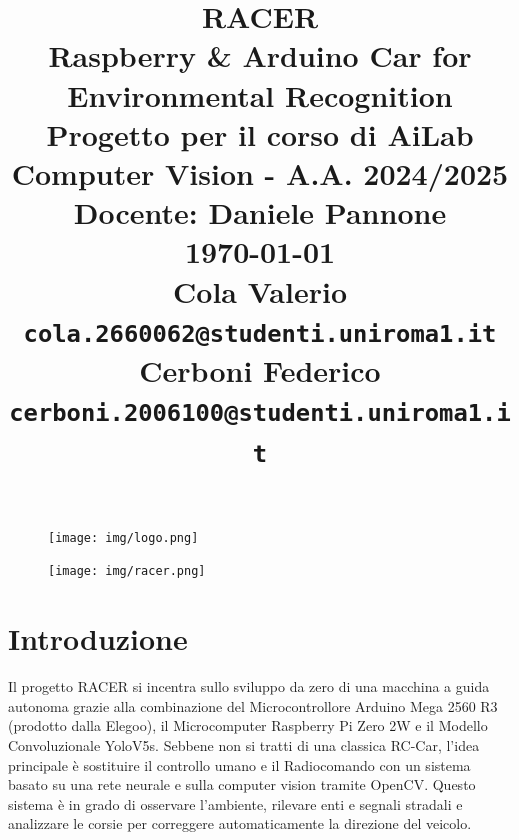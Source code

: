 \documentclass{article}
\begin{document}
\begin{figure}
    \texttt{[image: img/logo.png]}
\end{figure}

\title{
  \textbf{RACER} \\
  \Large\textbf{Raspberry \& Arduino Car for Environmental Recognition} \\
  \vspace{1cm}
  \large{Progetto per il corso di AiLab Computer Vision - A.A. 2024/2025} \\
  \vspace{0.5cm}
  \large{Docente: Daniele Pannone} \\
  \vspace{0.5cm}
  \large \today\\[24pt]
    
  \large{Cola Valerio \texttt{cola.2660062@studenti.uniroma1.it}}\\
  \large{Cerboni Federico \texttt{cerboni.2006100@studenti.uniroma1.it}} 
}

\date{}
\maketitle

\begin{figure}[h!]
    \centering
    \texttt{[image: img/racer.png]}
\end{figure}


\newpage    

\tableofcontents

\newpage    

\section{Introduzione}
    Il progetto RACER si incentra sullo sviluppo da zero di una macchina a guida autonoma grazie alla combinazione del Microcontrollore \cite{arduinomega}
    Arduino Mega 2560 R3 (prodotto dalla Elegoo), il Microcomputer \cite{pizero} Raspberry Pi Zero 2W e il Modello Convoluzionale \cite{yolo} YoloV5s. 
    Sebbene non si tratti di una classica RC-Car, l'idea principale è sostituire il controllo umano e il Radiocomando con un sistema basato su una rete neurale e sulla computer vision tramite OpenCV. Questo sistema è in grado di osservare l'ambiente, rilevare enti e segnali stradali e analizzare le corsie per correggere automaticamente la direzione del veicolo.
\end{document}
